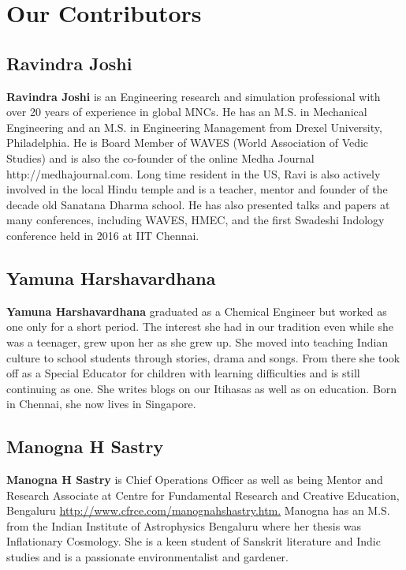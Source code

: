 
\chapter*{Our Contributors }

\section*{Ravindra Joshi}

\textbf{Ravindra Joshi} is an Engineering research and simulation professional with over 20 years of experience in global MNCs. He has an M.S. in Mechanical Engineering and an M.S. in Engineering Management from Drexel University, Philadelphia. He is Board Member of WAVES (World Association of Vedic Studies) and is also the co-founder of the online Medha Journal http://medhajournal.com. Long time resident in the US, Ravi is also actively involved in the local Hindu temple and is a teacher, mentor and founder of the decade old Sanatana Dharma school. He has also presented talks and papers at many conferences, including WAVES, HMEC, and the first Swadeshi Indology conference held in 2016 at IIT Chennai.

\section*{Yamuna Harshavardhana}

\textbf{Yamuna Harshavardhana} graduated as a Chemical Engineer but worked as one only for a short period. The interest she had in our tradition even while she was a teenager, grew upon her as she grew up. She moved into teaching Indian culture to school students through stories, drama and songs. From there she took off as a Special Educator for children with learning difficulties and is still continuing as one. She writes blogs on our Itihasas as well as on education. Born in Chennai, she now lives in Singapore.

\newpage

\section*{Manogna H Sastry}

\textbf{Manogna H Sastry} is Chief Operations Officer as well as being Mentor and Research Associate at Centre for Fundamental Research and Creative Education, Bengaluru \url{http://www.cfrce.com/manognahshastry.htm.} Manogna has an M.S. from the Indian Institute of Astrophysics Bengaluru where her thesis was Inflationary Cosmology. She is a keen student of Sanskrit literature and Indic studies and is a passionate environmentalist and gardener.

